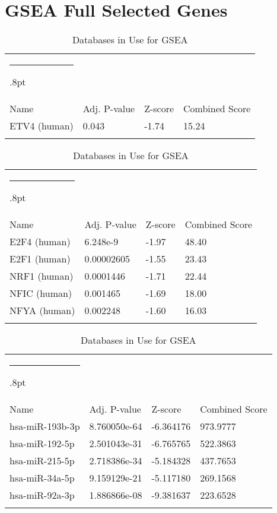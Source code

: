 \documentclass[3p,authoryear,preprint,12pt]{elsarticle}
\makeatletter
\def\hlinewd#1{%
  \noalign{\ifnum0=`}\fi\hrule \@height #1%
  \futurelet\reserved@a\@xhline}
\def\tbltoprule{\hlinewd{.8pt}\\[-12pt]}
\def\tblbottomrule{\noalign{\vspace*{6pt}}\hline\noalign{\vspace*{2pt}}}
\def\tblmidrule{\noalign{\vspace*{6pt}}\hline\noalign{\vspace*{2pt}}}
\makeatother
\begin{document}
\section{GSEA Full Selected Genes}\label{appendix-title-fe590e9f8eaf}
\begin{table*}[!htbp]
	\caption{{Databases in Use for GSEA} }
	\label{tw-de478ae31cc6}
	\def\arraystretch{1}
	\ignorespaces 
	\centering 
	\begin{tabulary}{\linewidth}{p{\dimexpr.65\tabcolsep}p{\dimexpr.15\tabcolsep}p{\dimexpr.1\tabcolsep}p{\dimexpr.1\tabcolsep}}
		\tbltoprule Name & Adj. P-value & Z-score & Combined Score\\
		\tblmidrule 
ETV4 (human) & 0.043 & -1.74 & 15.24  \\
		\tblbottomrule
	\end{tabulary}\par 
\end{table*}
\begin{table*}[!htbp]
	\caption{{Databases in Use for GSEA} }
	\label{tw-de478ae31cc6}
	\def\arraystretch{1}
	\ignorespaces 
	\centering 
	\begin{tabulary}{\linewidth}{p{\dimexpr.65\tabcolsep}p{\dimexpr.15\tabcolsep}p{\dimexpr.1\tabcolsep}p{\dimexpr.1\tabcolsep}}
		\tbltoprule Name & Adj. P-value & Z-score & Combined Score\\
		\tblmidrule 
E2F4 (human) & 6.248e-9 & -1.97 & 48.40 \\
E2F1 (human) & 0.00002605 & -1.55 & 23.43 \\
NRF1 (human) & 0.0001446 & -1.71 & 22.44 \\
NFIC (human) & 0.001465 & -1.69 & 18.00 \\
NFYA (human) & 0.002248 & -1.60 & 16.03 \\
		\tblbottomrule
	\end{tabulary}\par 
\end{table*}
\begin{table*}[!htbp]
	\caption{{Databases in Use for GSEA} }
	\label{tw-de478ae31cc6}
	\def\arraystretch{1}
	\ignorespaces 
	\centering 
	\begin{tabulary}{\linewidth}{p{\dimexpr.65\tabcolsep}p{\dimexpr.15\tabcolsep}p{\dimexpr.1\tabcolsep}p{\dimexpr.1\tabcolsep}}
		\tbltoprule Name & Adj. P-value & Z-score & Combined Score\\
		\tblmidrule
hsa-miR-193b-3p & 8.760050e-64 & -6.364176 & 973.9777 \\
hsa-miR-192-5p & 2.501043e-31 & -6.765765 & 522.3863 \\
hsa-miR-215-5p & 2.718386e-34 & -5.184328 & 437.7653 \\
hsa-miR-34a-5p & 9.159129e-21 & -5.117180 & 269.1568 \\
hsa-miR-92a-3p & 1.886866e-08 & -9.381637 & 223.6528 \\
		\tblbottomrule
	\end{tabulary}\par 
\end{table*}
\end{document}
